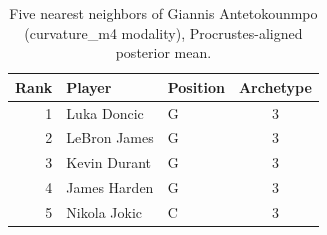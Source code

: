 \begin{table}[htbp]
  \centering\small
  \begin{tabular}{rllc}
    \toprule
    Rank & Player & Position & Archetype \\
    \midrule
    1 & Luka Doncic & G & 3 \\
    2 & LeBron James & G & 3 \\
    3 & Kevin Durant & G & 3 \\
    4 & James Harden & G & 3 \\
    5 & Nikola Jokic & C & 3 \\
    \bottomrule
  \end{tabular}
  \caption{Five nearest neighbors of Giannis Antetokounmpo (curvature_m4 modality), Procrustes-aligned posterior mean.}
  \label{tab:Giannis_Antetokounmpo_neighbors_curvature_m4}
\end{table}

